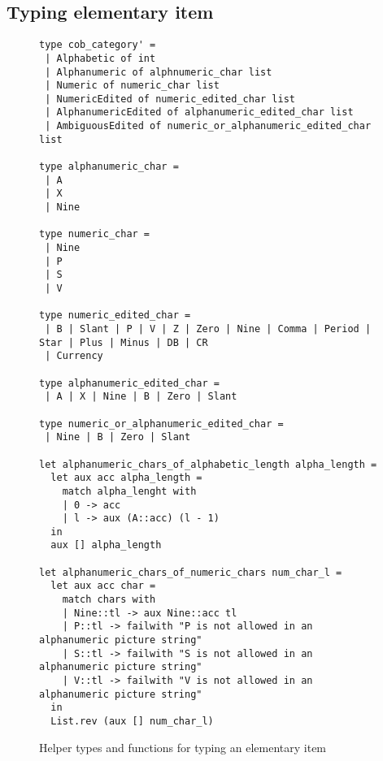 \documentclass[a4paper,10pt]{article}
\begin{document}
\subsection{Typing elementary item}
\begin{figure}[H]
  \begin{verbatim}
type cob_category' =
 | Alphabetic of int
 | Alphanumeric of alphnumeric_char list
 | Numeric of numeric_char list
 | NumericEdited of numeric_edited_char list
 | AlphanumericEdited of alphanumeric_edited_char list
 | AmbiguousEdited of numeric_or_alphanumeric_edited_char list

type alphanumeric_char =
 | A
 | X
 | Nine

type numeric_char =
 | Nine
 | P
 | S
 | V

type numeric_edited_char =
 | B | Slant | P | V | Z | Zero | Nine | Comma | Period | Star | Plus | Minus | DB | CR
 | Currency

type alphanumeric_edited_char =
 | A | X | Nine | B | Zero | Slant

type numeric_or_alphanumeric_edited_char =
 | Nine | B | Zero | Slant

let alphanumeric_chars_of_alphabetic_length alpha_length =
  let aux acc alpha_length =
    match alpha_lenght with
    | 0 -> acc
    | l -> aux (A::acc) (l - 1)
  in
  aux [] alpha_length

let alphanumeric_chars_of_numeric_chars num_char_l =
  let aux acc char =
    match chars with
    | Nine::tl -> aux Nine::acc tl
    | P::tl -> failwith "P is not allowed in an alphanumeric picture string"
    | S::tl -> failwith "S is not allowed in an alphanumeric picture string"
    | V::tl -> failwith "V is not allowed in an alphanumeric picture string"
  in
  List.rev (aux [] num_char_l)
  \end{verbatim}
  \caption{Helper types and functions for typing an elementary item}
  \label{fig:aux_elem_pic}
\end{figure}
\end{document}
